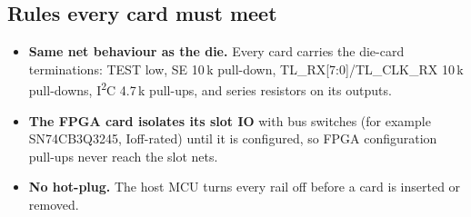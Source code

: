 \documentclass[10pt,a4paper]{article}
\begin{document}
\subsection{Rules every card must meet}\label{sec:everycard}
\begin{itemize}
\item \textbf{Same net behaviour as the die.} Every card carries the die-card terminations: TEST low, SE 10\,k\textohm{} pull-down, TL\_RX[7:0]/TL\_CLK\_RX 10\,k\textohm{} pull-downs, I\textsuperscript{2}C 4.7\,k\textohm{} pull-ups, and series resistors on its outputs.
\item \textbf{The FPGA card isolates its slot IO} with bus switches (for example SN74CB3Q3245, Ioff-rated) until it is configured, so FPGA configuration pull-ups never reach the slot nets.
\item \textbf{No hot-plug.} The host MCU turns every rail off before a card is inserted or removed.
\end{itemize}
\end{document}
